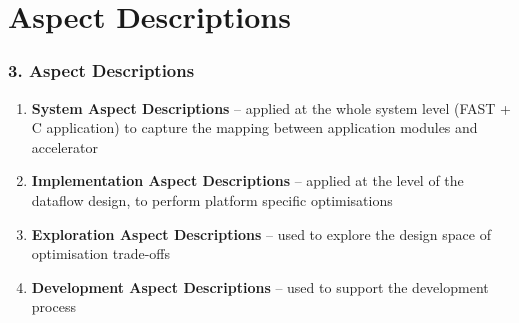 \section{Aspect Descriptions}
\begin{frame}
  \frametitle{3. Aspect Descriptions}
  \begin{enumerate}
  \setlength{\itemsep}{15pt}
  \item \textbf{System Aspect Descriptions} -- applied at the whole
    system level (FAST + C application) to capture the mapping
    between application modules and accelerator
  \item \textbf{Implementation Aspect Descriptions} -- applied at the
    level of the dataflow design, to perform platform specific
    optimisations
  \item \textbf{Exploration Aspect Descriptions} -- used to explore the
    design space of optimisation trade-offs
  \item \textbf{Development Aspect Descriptions}  -- used to support
    the development process
  \end{enumerate}
\end{frame}

\begin{comment}
\begin{frame}
  \frametitle{System Aspect Descriptions}
  Hardware/Software Partitioning:
  \begin{enumerate}
  \setlength{\itemsep}{10pt}
  \item detect hotspots
  \item detect code patterns suitable for acceleration
  \item perform outlining transformation
  \item derive dataflow \texttt{fast\_f()} from \texttt{f()}
  \item place FAST pragma to link \texttt{fast\_f()} with \texttt{f()}
  \end{enumerate}
\end{frame}
\end{comment}


\begin{comment}
\begin{frame}[fragile]
  \frametitle{System Aspect Descriptions: Monitoring}
  For all innermost loops:
  \begin{itemize}
  \item Monitor every loop iteration
  \item Monitor every loop entry and exit
  \end{itemize}
  \begin{lstlisting}[label=lst:label, style=lara]
aspectdef LoopMonitor
function.loop{is_innermost}:
  entry:   prepend(mon_iterationIn())
  exit :   append (mon_iterationOut())
  default: prepend(mon_instanceIn())
           append(mon_instanceOut())
end
  \end{lstlisting}
\end{frame}
\end{comment}


